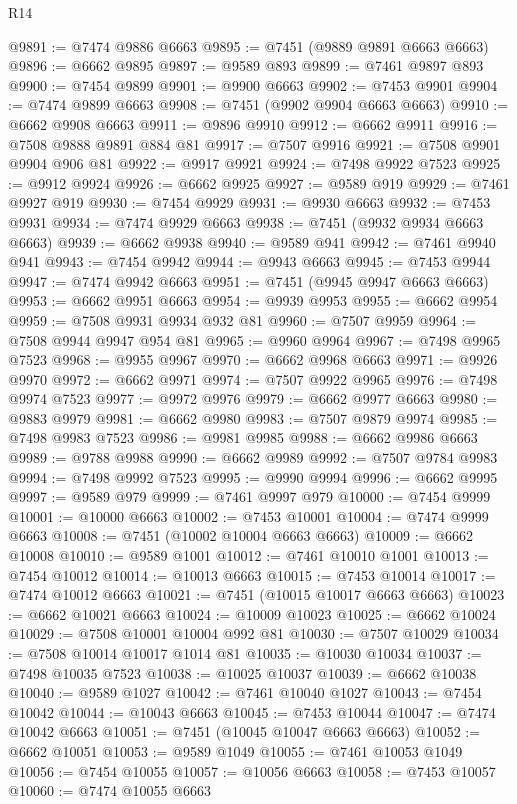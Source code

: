 \begin{lexlean}{R14}
\begin{coremodule}
{{{{{{{{{{{{{{{{{{{{{{{{{{{{{{{{{{{{{{{{{{{{{{{{{{{{{{{{{{{{{{{{{{{{{{{{{{{{{{{{{{@9891 := @7474 @9886 @6663
@9895 := @7451 (@9889 @9891 @6663 @6663)
@9896 := @6662 @9895
@9897 := @9589 @893
@9899 := @7461 @9897 @893
@9900 := @7454 @9899
@9901 := @9900 @6663
@9902 := @7453 @9901
@9904 := @7474 @9899 @6663
@9908 := @7451 (@9902 @9904 @6663 @6663)
@9910 := @6662 @9908 @6663
@9911 := @9896 @9910
@9912 := @6662 @9911
@9916 := @7508 @9888 @9891 @884 @81
@9917 := @7507 @9916
@9921 := @7508 @9901 @9904 @906 @81
@9922 := @9917 @9921
@9924 := @7498 @9922 @7523
@9925 := @9912 @9924
@9926 := @6662 @9925
@9927 := @9589 @919
@9929 := @7461 @9927 @919
@9930 := @7454 @9929
@9931 := @9930 @6663
@9932 := @7453 @9931
@9934 := @7474 @9929 @6663
@9938 := @7451 (@9932 @9934 @6663 @6663)
@9939 := @6662 @9938
@9940 := @9589 @941
@9942 := @7461 @9940 @941
@9943 := @7454 @9942
@9944 := @9943 @6663
@9945 := @7453 @9944
@9947 := @7474 @9942 @6663
@9951 := @7451 (@9945 @9947 @6663 @6663)
@9953 := @6662 @9951 @6663
@9954 := @9939 @9953
@9955 := @6662 @9954
@9959 := @7508 @9931 @9934 @932 @81
@9960 := @7507 @9959
@9964 := @7508 @9944 @9947 @954 @81
@9965 := @9960 @9964
@9967 := @7498 @9965 @7523
@9968 := @9955 @9967
@9970 := @6662 @9968 @6663
@9971 := @9926 @9970
@9972 := @6662 @9971
@9974 := @7507 @9922 @9965
@9976 := @7498 @9974 @7523
@9977 := @9972 @9976
@9979 := @6662 @9977 @6663
@9980 := @9883 @9979
@9981 := @6662 @9980
@9983 := @7507 @9879 @9974
@9985 := @7498 @9983 @7523
@9986 := @9981 @9985
@9988 := @6662 @9986 @6663
@9989 := @9788 @9988
@9990 := @6662 @9989
@9992 := @7507 @9784 @9983
@9994 := @7498 @9992 @7523
@9995 := @9990 @9994
@9996 := @6662 @9995
@9997 := @9589 @979
@9999 := @7461 @9997 @979
@10000 := @7454 @9999
@10001 := @10000 @6663
@10002 := @7453 @10001
@10004 := @7474 @9999 @6663
@10008 := @7451 (@10002 @10004 @6663 @6663)
@10009 := @6662 @10008
@10010 := @9589 @1001
@10012 := @7461 @10010 @1001
@10013 := @7454 @10012
@10014 := @10013 @6663
@10015 := @7453 @10014
@10017 := @7474 @10012 @6663
@10021 := @7451 (@10015 @10017 @6663 @6663)
@10023 := @6662 @10021 @6663
@10024 := @10009 @10023
@10025 := @6662 @10024
@10029 := @7508 @10001 @10004 @992 @81
@10030 := @7507 @10029
@10034 := @7508 @10014 @10017 @1014 @81
@10035 := @10030 @10034
@10037 := @7498 @10035 @7523
@10038 := @10025 @10037
@10039 := @6662 @10038
@10040 := @9589 @1027
@10042 := @7461 @10040 @1027
@10043 := @7454 @10042
@10044 := @10043 @6663
@10045 := @7453 @10044
@10047 := @7474 @10042 @6663
@10051 := @7451 (@10045 @10047 @6663 @6663)
@10052 := @6662 @10051
@10053 := @9589 @1049
@10055 := @7461 @10053 @1049
@10056 := @7454 @10055
@10057 := @10056 @6663
@10058 := @7453 @10057
@10060 := @7474 @10055 @6663
}}}}}}}}}}}}}}}}}}}}}}}}}}}}}}}}}}}}}}}}}}}}}}}}}}}}}}}}}}}}}}}}}}}}}}}}}}}}}}}}}}
\end{coremodule}
\end{lexlean}

